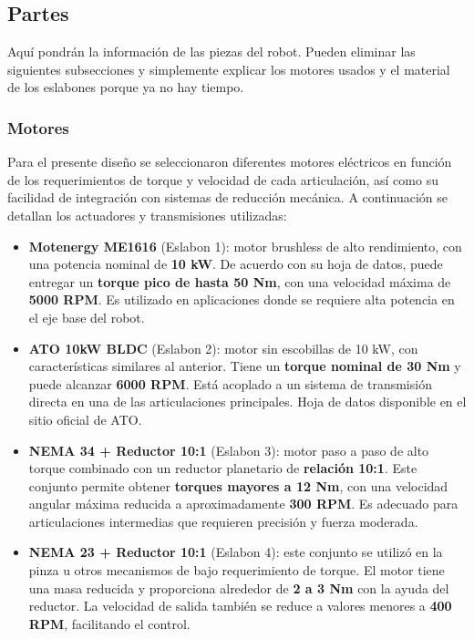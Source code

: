 \subsection{Partes} \label{subsec:partes}
Aquí pondrán la información de las piezas del robot. Pueden eliminar las siguientes subsecciones y simplemente explicar los motores usados y el material de los eslabones porque ya no hay tiempo.
\subsubsection{Motores} \label{subsubsec:motores}

Para el presente diseño se seleccionaron diferentes motores eléctricos en función de los requerimientos de torque y velocidad de cada articulación, así como su facilidad de integración con sistemas de reducción mecánica. A continuación se detallan los actuadores y transmisiones utilizadas:

\begin{itemize}
    \item \textbf{Motenergy ME1616} (Eslabon 1): motor brushless de alto rendimiento, con una potencia nominal de \textbf{10 kW}. De acuerdo con su hoja de datos, puede entregar un \textbf{torque pico de hasta 50 Nm}, con una velocidad máxima de \textbf{5000 RPM}. Es utilizado en aplicaciones donde se requiere alta potencia en el eje base del robot.

    \item \textbf{ATO 10kW BLDC} (Eslabon 2): motor sin escobillas de 10 kW, con características similares al anterior. Tiene un \textbf{torque nominal de 30 Nm} y puede alcanzar \textbf{6000 RPM}. Está acoplado a un sistema de transmisión directa en una de las articulaciones principales. Hoja de datos disponible en el sitio oficial de ATO.

    \item \textbf{NEMA 34 + Reductor 10:1} (Eslabon 3): motor paso a paso de alto torque combinado con un reductor planetario de \textbf{relación 10:1}. Este conjunto permite obtener \textbf{torques mayores a 12 Nm}, con una velocidad angular máxima reducida a aproximadamente \textbf{300 RPM}. Es adecuado para articulaciones intermedias que requieren precisión y fuerza moderada.

    \item \textbf{NEMA 23 + Reductor 10:1} (Eslabon 4): este conjunto se utilizó en la pinza u otros mecanismos de bajo requerimiento de torque. El motor tiene una masa reducida y proporciona alrededor de \textbf{2 a 3 Nm} con la ayuda del reductor. La velocidad de salida también se reduce a valores menores a \textbf{400 RPM}, facilitando el control.

\end{itemize}

